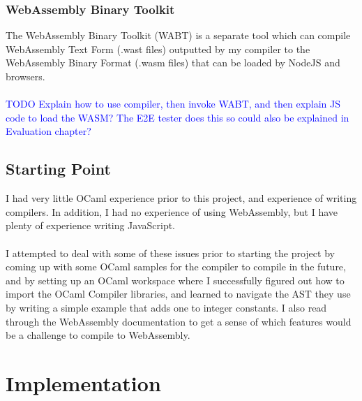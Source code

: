 \documentclass[12pt,twoside,notitlepage]{report}
\newcommand\note[1]{\textcolor{blue}{#1}}
\begin{document}
\subsection{WebAssembly Binary Toolkit}
The WebAssembly Binary Toolkit \cite{Wabt} (WABT)  is a separate tool which can compile WebAssembly Text Form (.wast files) outputted by my compiler to the WebAssembly Binary Format (.wasm files) that can be loaded by NodeJS and browsers.
\\\\
\note{TODO Explain how to use compiler, then invoke WABT, and then explain JS code to load the WASM? The E2E tester does this so could also be explained in Evaluation chapter?}

\section{Starting Point}
I had very little OCaml experience prior to this project, and experience of writing compilers. In addition, I had no experience of using WebAssembly, but I have plenty of experience writing JavaScript.
\\\\
I attempted to deal with some of these issues prior to starting the project by coming up with some OCaml samples for the compiler to compile in the future, and by setting up an OCaml workspace where I successfully figured out how to import the OCaml Compiler libraries, and learned to navigate the AST they use by writing a simple example that adds one to integer constants. I also read through the WebAssembly documentation to get a sense of which features would be a challenge to compile to WebAssembly.

\clearpage
\chapter{Implementation}
%
%
%
\end{document}
